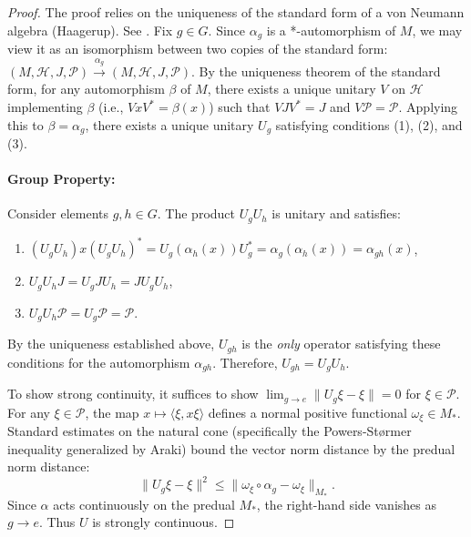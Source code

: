 \documentclass{article}
\theoremstyle{definition}
\begin{document}
  \begin{proof}
    The proof relies on the uniqueness of the standard form of a von Neumann algebra
    (Haagerup). See \cite{haag2012local}. Fix $g \in G$. Since $\alpha_{g}$ is a
    *-automorphism of $M$, we may view it as an isomorphism between two copies of
    the standard form:
    $(M, \mathcal{H}, J, \mathcal{P}) \xrightarrow{\alpha_g}(M, \mathcal{H}, J, \mathcal{P}
    )$. By the uniqueness theorem of the standard form, for any automorphism
    $\beta$ of $M$, there exists a unique unitary $V$ on $\mathcal{H}$ implementing
    $\beta$ (i.e., $V x V^{*}= \beta(x)$) such that $V J V^{*}= J$ and $V \mathcal{P}
    = \mathcal{P}$. Applying this to $\beta = \alpha_{g}$, there exists a unique
    unitary $U_{g}$ satisfying conditions (1), (2), and (3).

    \paragraph{Group Property:}
    Consider elements $g, h \in G$. The product $U_{g}U_{h}$ is unitary and satisfies:
    \begin{enumerate}
      \item $(U_{g}U_{h}) x (U_{g}U_{h})^{*}= U_{g}(\alpha_{h}(x)) U_{g}^{*}= \alpha
        _{g}(\alpha_{h}(x)) = \alpha_{gh}(x)$,

      \item $U_{g}U_{h}J = U_{g}J U_{h}= J U_{g}U_{h}$,

      \item $U_{g}U_{h}\mathcal{P}= U_{g}\mathcal{P}= \mathcal{P}$.
    \end{enumerate}
    By the uniqueness established above, $U_{gh}$ is the \textit{only} operator
    satisfying these conditions for the automorphism $\alpha_{gh}$. Therefore,
    $U_{gh}= U_{g}U_{h}$.

    To show strong continuity, it suffices to show $\lim_{g \to e}\|U_{g}\xi - \xi
    \| = 0$ for $\xi \in \mathcal{P}$. For any $\xi \in \mathcal{P}$, the map $x
    \mapsto \langle \xi, x \xi \rangle$ defines a normal positive functional $\omega
    _{\xi}\in M_{*}$. Standard estimates on the natural cone (specifically the Powers-St{\o}rmer
    inequality generalized by Araki) bound the vector norm distance by the
    predual norm distance:
    \[
      \|U_{g}\xi - \xi\|^{2}\leq \| \omega_{\xi}\circ \alpha_{g}- \omega_{\xi}\|_{M_*}
      .
    \]
    Since $\alpha$ acts continuously on the predual $M_{*}$, the right-hand side
    vanishes as $g \to e$. Thus $U$ is strongly continuous.
  \end{proof}
\end{document}
